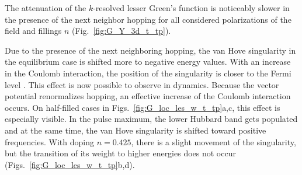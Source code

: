 The attenuation of the $k$-resolved lesser Green's function is noticeably slower in the presence of the next neighbor hopping for all considered polarizations of the field and fillings $n$ (Fig.~\ref{fig:G_Y_3d_t_tp}).

Due to the presence of the next neighboring hopping, the van Hove singularity in the equilibrium case is shifted more to negative energy values. With an increase in the Coulomb interaction, the position of the singularity is closer to the Fermi level \cite{PhysRevB.54.12505}. This effect is now possible to observe in dynamics. Because the vector potential renormalizes hopping, an effective increase of the Coulomb interaction occurs. 
On half-filled cases in Figs.~\ref{fig:G_loc_les_w_t_tp}a,c, this effect is especially visible. In the pulse maximum, the lower Hubbard band gets populated and at the same time, the van Hove singularity is shifted toward positive frequencies. With doping $n=0.425$, there is a slight movement of the singularity, but the transition of its weight to higher energies does not occur (Figs.~\ref{fig:G_loc_les_w_t_tp}b,d).
